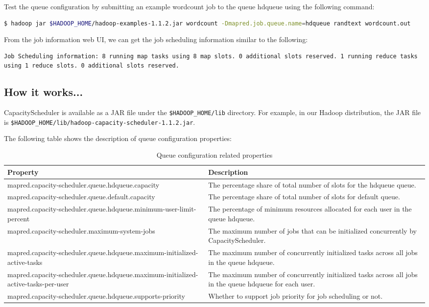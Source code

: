 Test the queue configuration by submitting an example wordcount job to the queue hdqueue using the following command: 
\lstset{style=bashstyle}
\begin{lstlisting}[language=bash]
$ hadoop jar $HADOOP_HOME/hadoop-examples-1.1.2.jar wordcount -Dmapred.job.queue.name=hdqueue randtext wordcount.out
\end{lstlisting}

From the job information web UI, we can get the job scheduling information similar to the following: 
\lstset{style=bashstyle}
\begin{lstlisting}
Job Scheduling information: 8 running map tasks using 8 map slots. 0 additional slots reserved. 1 running reduce tasks using 1 reduce slots. 0 additional slots reserved.
\end{lstlisting}

\subsection*{How it works...}
CapacityScheduler is available as a JAR file under the \verb|$HADOOP_HOME/lib| directory. For example, in our Hadoop distribution, the JAR file is \verb|$HADOOP_HOME/lib/hadoop-capacity-scheduler-1.1.2.jar|.

The following table shows the description of queue configuration properties: 

\begin{table}[ht]
  \scriptsize
  \centering
  \begin{tabular}{p{}p{}}
    \toprule 
    \textbf{Property} & \textbf{Description} \\ \midrule
    mapred.capacity-scheduler.queue.hdqueue.capacity & The percentage share of total number of slots for the hdqueue queue. \\
    mapred.capacity-scheduler.queue.default.capacity & The percentage share of total number of slots for default queue.\\
    mapred.capacity-scheduler.queue.hdqueue.minimum-user-limit-percent & The percentage of minimum resources allocated for each user in the queue hdqueue. \\
    mapred.capacity-scheduler.maximum-system-jobs & The maximum number of jobs that can be initialized concurrently by CapacityScheduler. \\
    mapred.capacity-scheduler.queue.hdqueue.maximum-initialized-active-tasks & The maximum number of concurrently initialized tasks across all jobs in the queue hdqueue. \\
    mapred.capacity-scheduler.queue.hdqueue.maximum-initialized-active-tasks-per-user & The maximum number of concurrently initialized tasks across all jobs in the queue hdqueue for each user. \\
    mapred.capacity-scheduler.queue.hdqueue.supports-priority & Whether to support job priority for job scheduling or not. \\ \bottomrule
  \end{tabular}
  \caption{Queue configuration related properties}\label{tbl:queueconfig}
\end{table}

